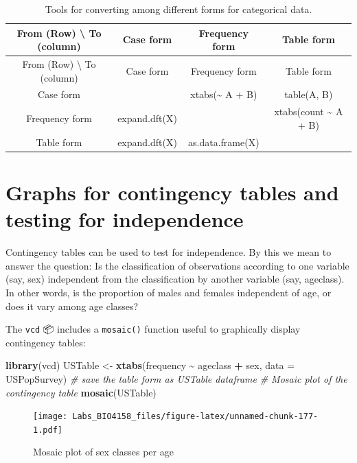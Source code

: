 \documentclass[
  12pt,
]{book}
\newenvironment{Shaded}{\begin{snugshade}}{\end{snugshade}}
\newcommand{\CommentTok}[1]{\textcolor[rgb]{0.56,0.35,0.01}{\textit{#1}}}
\newcommand{\DataTypeTok}[1]{\textcolor[rgb]{0.13,0.29,0.53}{#1}}
\newcommand{\KeywordTok}[1]{\textcolor[rgb]{0.13,0.29,0.53}{\textbf{#1}}}
\newcommand{\NormalTok}[1]{#1}
\newcommand{\OperatorTok}[1]{\textcolor[rgb]{0.81,0.36,0.00}{\textbf{#1}}}
\newcommand{\StringTok}[1]{\textcolor[rgb]{0.31,0.60,0.02}{#1}}
\begin{document}
\begin{longtable}[]{@{}cccc@{}}
\caption{\label{tab:unnamed-chunk-1}Tools for converting among different forms for categorical data.}\tabularnewline
\toprule
From (Row) \textbackslash{} To (column) & Case form & Frequency form & Table form\tabularnewline
\midrule
\endfirsthead
\toprule
From (Row) \textbackslash{} To (column) & Case form & Frequency form & Table form\tabularnewline
\midrule
\endhead
Case form & & xtabs(\textasciitilde{} A + B) & table(A, B)\tabularnewline
Frequency form & expand.dft(X) & & xtabs(count \textasciitilde{} A + B)\tabularnewline
Table form & expand.dft(X) & as.data.frame(X) &\tabularnewline
\bottomrule
\end{longtable}

\hypertarget{graphs-for-contingency-tables-and-testing-for-independence}{%
\section{Graphs for contingency tables and testing for independence}\label{graphs-for-contingency-tables-and-testing-for-independence}}

Contingency tables can be used to test for independence. By this we mean to answer the question: Is the classification of observations according to one variable (say, sex) independent from the classification by another variable (say, ageclass). In other words, is the proportion of males and females independent of age, or does it vary among age classes?

The \texttt{vcd} 📦 includes a \texttt{mosaic()} function useful to graphically display contingency tables:

\begin{Shaded}
\begin{Highlighting}[]
\KeywordTok{library}\NormalTok{(vcd)}
\NormalTok{USTable \textless{}{-}}\StringTok{ }\KeywordTok{xtabs}\NormalTok{(frequency }\OperatorTok{\textasciitilde{}}\StringTok{ }\NormalTok{ageclass }\OperatorTok{+}\StringTok{ }\NormalTok{sex, }\DataTypeTok{data =}\NormalTok{ USPopSurvey) }\CommentTok{\# save the table form as USTable dataframe}
\CommentTok{\# Mosaic plot of the contingency table}
\KeywordTok{mosaic}\NormalTok{(USTable)}
\end{Highlighting}
\end{Shaded}

\begin{figure}
\centering
\texttt{[image: Labs\_BIO4158\_files/figure-latex/unnamed-chunk-177-1.pdf]}
\caption{\label{fig:unnamed-chunk-177}Mosaic plot of sex classes per age}
\end{figure}
\end{document}
